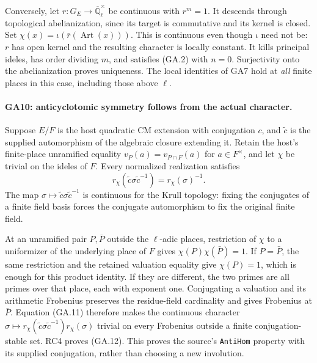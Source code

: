 Conversely, let $r:G_E\to\overline{\mathbb Q}_\ell^\times$
be continuous with $r^m=1$. It descends through topological
abelianization, since its target is commutative and its
kernel is closed. Set
$\chi(x)=\iota(\bar r(\operatorname{Art}(x)))$.
This is continuous even though $\iota$ need not be:
$r$ has open kernel and the resulting character is locally
constant. It kills principal ideles, has order dividing
$m$, and satisfies (GA.2) with $n=0$.
Surjectivity onto the abelianization proves uniqueness.
The local identities of GA7 hold at \emph{all} finite places
in this case, including those above $\ell$.

\paragraph{GA10: anticyclotomic symmetry follows from the actual character.}
Suppose $E/F$ is the host quadratic CM extension with conjugation
$c$, and $\widetilde c$ is the supplied automorphism of the
algebraic closure extending it. Retain the host's finite-place
unramified equality
$v_P(a)=v_{P\cap F}(a)$ for $a\in F^\times$, and let
$\chi$ be trivial on the ideles of $F$. Every normalized
realization satisfies
\[
 r_\chi(\widetilde c\sigma\widetilde c^{-1})
      =r_\chi(\sigma)^{-1}.                             \tag{GA.12}
\]
The map $\sigma\mapsto\widetilde c\sigma\widetilde c^{-1}$
is continuous for the Krull topology: fixing the conjugates
of a finite field basis forces the conjugate automorphism
to fix the original finite field.

At an unramified pair $P,\bar P$ outside the $\ell$-adic
places, restriction of $\chi$ to a uniformizer of the
underlying place of $F$ gives
$\chi(P)\chi(\bar P)=1$. If $P=\bar P$, the same restriction
and the retained valuation equality give $\chi(P)=1$,
which is enough for this product identity. If they are
different, the two primes are all primes over that place,
each with exponent one. Conjugating a valuation and its
arithmetic Frobenius preserves the residue-field cardinality
and gives Frobenius at $\bar P$. Equation (GA.11) therefore
makes the continuous character
$\sigma\mapsto r_\chi(\widetilde c\sigma\widetilde c^{-1})
r_\chi(\sigma)$ trivial on every Frobenius outside a finite
conjugation-stable set. RC4 proves (GA.12). This proves the
source's \texttt{AntiHom} property with its supplied
conjugation, rather than choosing a new involution.

